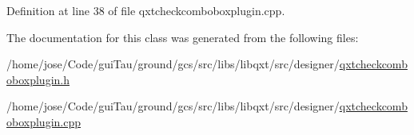 Definition at line 38 of file qxtcheckcomboboxplugin.\-cpp.



The documentation for this class was generated from the following files\-:\begin{DoxyCompactItemize}
\item 
/home/jose/\-Code/gui\-Tau/ground/gcs/src/libs/libqxt/src/designer/\hyperlink{qxtcheckcomboboxplugin_8h}{qxtcheckcomboboxplugin.\-h}\item 
/home/jose/\-Code/gui\-Tau/ground/gcs/src/libs/libqxt/src/designer/\hyperlink{qxtcheckcomboboxplugin_8cpp}{qxtcheckcomboboxplugin.\-cpp}\end{DoxyCompactItemize}
